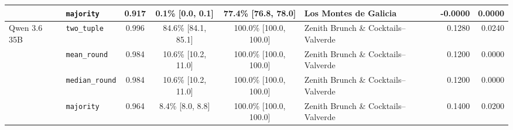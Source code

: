 \begin{table}[htbp]
\begin{tabular}{llccclrr}
   & \texttt{majority} & 0.917 & 0.1\% \tiny[0.0, 0.1] & 77.4\% \tiny[76.8, 78.0] & Los Montes de Galicia & -0.0000 & 0.0000 \\
\midrule
  \multirow{4}{*}{Qwen 3.6 35B} & \texttt{two\_tuple} & 0.996 & 84.6\% \tiny[84.1, 85.1] & 100.0\% \tiny[100.0, 100.0] & Zenith Brunch \& Cocktails--Valverde & 0.1280 & 0.0240 \\
   & \texttt{mean\_round} & 0.984 & 10.6\% \tiny[10.2, 11.0] & 100.0\% \tiny[100.0, 100.0] & Zenith Brunch \& Cocktails--Valverde & 0.1200 & 0.0000 \\
   & \texttt{median\_round} & 0.984 & 10.6\% \tiny[10.2, 11.0] & 100.0\% \tiny[100.0, 100.0] & Zenith Brunch \& Cocktails--Valverde & 0.1200 & 0.0000 \\
   & \texttt{majority} & 0.964 & 8.4\% \tiny[8.0, 8.8] & 100.0\% \tiny[100.0, 100.0] & Zenith Brunch \& Cocktails--Valverde & 0.1400 & 0.0200 \\
\bottomrule
\end{tabular}
\end{table}

